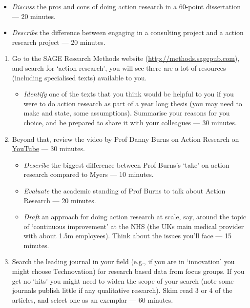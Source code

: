 \documentclass[]{book}
\providecommand{\tightlist}{%
  \setlength{\itemsep}{0pt}\setlength{\parskip}{0pt}}
\theoremstyle{definition}
\theoremstyle{definition}
\theoremstyle{definition}
\theoremstyle{remark}
\begin{document}
\begin{itemize}
\item
  \emph{Discuss} the pros and cons of doing action research in a
  60-point dissertation --- 20 minutes.
\item
  \emph{Describe} the difference between engaging in a consulting
  project and a action research project --- 20 minutes.
\end{itemize}

\begin{enumerate}
\def\labelenumi{\arabic{enumi}.}
\setcounter{enumi}{1}
\item
  Go to the SAGE Research Methods website
  (\url{http://methods.sagepub.com}), and search for `action research',
  you will see there are a lot of resources (including specialised
  texts) available to you.

  \begin{itemize}
  \tightlist
  \item
    \emph{Identify} one of the texts that you think would be helpful to
    you if you were to do action research as part of a year long thesis
    (you may need to make and state, some assumptions). Summarise your
    reasons for you choice, and be prepared to share it with your
    colleagues --- 30 minutes.
  \end{itemize}
\item
  Beyond that, review the video by Prof Danny Burns on Action Research
  on \href{https://www.youtube.com/watch?v=tnnfWuud7J8}{YouTube} --- 30
  minutes.

  \begin{itemize}
  \item
    \emph{Describe} the biggest difference between Prof Burns's `take'
    on action research compared to Myers
    \autocite*{myers_2013_qualitativeresearchbusiness} --- 10 minutes.
  \item
    \emph{Evaluate} the academic standing of Prof Burns to talk about
    Action Research --- 20 minutes.
  \item
    \emph{Draft} an approach for doing action research at scale, say,
    around the topic of `continuous improvement' at the NHS (the UKs
    main medical provider with about 1.5m employees). Think about the
    issues you'll face --- 15 minutes.
  \end{itemize}
\item
  Search the leading journal in your field (e.g., if you are in
  `innovation' you might choose Technovation) for research based data
  from focus groups. If you get no `hits' you might need to widen the
  scope of your search (note some journals publish little if any
  qualitative research). Skim read 3 or 4 of the articles, and select
  one as an exemplar --- 60 minutes.


\end{enumerate}
\end{document}
